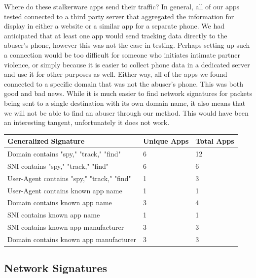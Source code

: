 \documentclass[acmtog]{acmart}
\begin{document}
Where do these stalkerware apps send their traffic? In general, all of our apps tested connected to a third party server that aggregated the information for display in either a website or a similar app for a separate phone. We had anticipated that at least one app would send tracking data directly to the abuser's phone, however this was not the case in testing. Perhaps setting up such a connection would be too difficult for someone who initiates intimate partner violence, or simply because it is easier to collect phone data in a dedicated server and use it for other purposes as well. Either way, all of the apps we found connected to a specific domain that was not the abuser's phone. This was both good and bad news. While it is much easier to find network signatures for packets being sent to a single destination with its own domain name, it also means that we will not be able to find an abuser through our method. This would have been an interesting tangent, unfortunately it does not work.
\begin{table}
	\begin{tabular}{p{5cm}p{5cm}p{5cm}}
		\toprule
		Generalized Signature & Unique Apps & Total Apps \\
		\hline
		Domain contains "spy," "track," "find" & 6 & 12 \\
		SNI contains "spy," "track," "find" & 6 & 6 \\
		User-Agent contains "spy," "track," "find" & 1 & 3 \\
		User-Agent contains known app name & 1 & 1 \\
		Domain contains known app name & 3 & 4 \\
		SNI contains known app name & 1 & 1 \\
		SNI contains known app manufacturer & 3 & 3 \\
		Domain contains known app manufacturer & 3 & 3 \\
		\midrule
	\end{tabular}
\end{table}
\subsection{Network Signatures}
\label{network_signatures}
\end{document}
